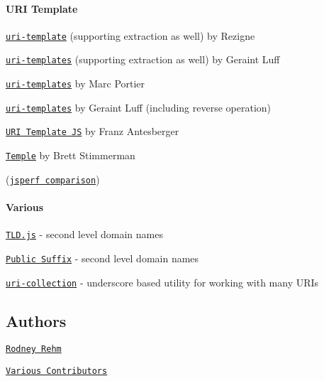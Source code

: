 \paragraph*{U\+RI Template}


\begin{DoxyItemize}
\item \href{https://github.com/rezigned/uri-template.js}{\tt uri-\/template} (supporting extraction as well) by Rezigne
\item \href{https://github.com/geraintluff/uri-templates}{\tt uri-\/templates} (supporting extraction as well) by Geraint Luff
\item \href{https://github.com/marc-portier/uri-templates}{\tt uri-\/templates} by Marc Portier
\item \href{https://github.com/geraintluff/uri-templates}{\tt uri-\/templates} by Geraint Luff (including reverse operation)
\item \href{https://github.com/fxa/uritemplate-js}{\tt U\+RI Template JS} by Franz Antesberger
\item \href{https://github.com/brettstimmerman/temple}{\tt Temple} by Brett Stimmerman
\item (\href{http://jsperf.com/uri-templates/2}{\tt jsperf comparison})
\end{DoxyItemize}

\paragraph*{Various}


\begin{DoxyItemize}
\item \href{https://github.com/oncletom/tld.js}{\tt T\+L\+D.\+js} -\/ second level domain names
\item \href{http://mxr.mozilla.org/mozilla-central/source/netwerk/dns/effective_tld_names.dat?raw=1}{\tt Public Suffix} -\/ second level domain names
\item \href{https://github.com/scivey/uri-collection}{\tt uri-\/collection} -\/ underscore based utility for working with many U\+R\+Is
\end{DoxyItemize}

\subsection*{Authors}


\begin{DoxyItemize}
\item \href{https://github.com/rodneyrehm}{\tt Rodney Rehm}
\item \href{https://github.com/medialize/URI.js/graphs/contributors}{\tt Various Contributors}
\end{DoxyItemize}

